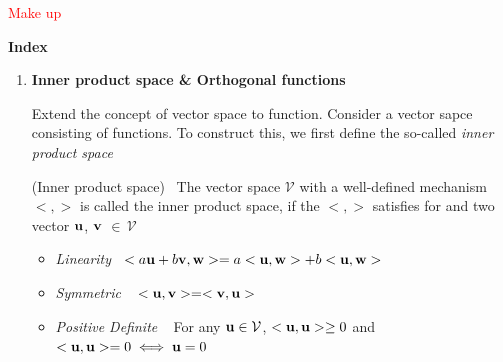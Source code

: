 \documentclass[10pt]{article}
\newenvironment{changemargin}[2]{%
  \begin{list}{}{%
    \setlength{\topsep}{0pt}%
    \setlength{\leftmargin}{#1}%
    \setlength{\rightmargin}{#2}%
    \setlength{\listparindent}{\parindent}%
    \setlength{\itemindent}{\parindent}%
    \setlength{\parsep}{\parskip}%
  }%
  \item[]}{\end{list}}
\begin{document}
\begin{changemargin}{-0.125in}{0in}
\begin{enumerate}
\begin{enumerate}
	               \textcolor{red}{Make up}
	               
	               \medskip
	               
	               
	            
	            
	            
	            
	            
	            
	            
	            
	            \end{enumerate}
	               
	   	   	 	\end{enumerate}
	   	   	 	
	   	   	 	\cleardoublepage
	   	   	 	
	   	   	 	\textbf{Index}
	   	   	 	
	   	   	 	\begin{enumerate}
	   	   	 		\item \textbf{Inner product space \& Orthogonal functions}
	   	   	 		
	   	   	 		\smallskip
	   	   	 		
	   	   	 		Extend the concept of vector space to function. Consider a vector sapce consisting of functions. To construct this, we first define the so-called \textit{inner product space}
	   	   	 		\begin{definition}
	   	   	 			(Inner product space) \, The vector space $\mathcal{V}$ with a well-defined mechanism $<,>$ is called the inner product space, if the $<,>$ satisfies for and two vector $\bold{u}$, $\bold{v}$ $\in \,\mathcal{V}$
	   	   	 			\begin{itemize}
	   	   	 				\item \textit{Linearity}\,\,\,\,\,$<a \bold{u} + b \bold{v}, \bold{w}> = a<\bold{u},\bold{w}> + b<\bold{u},\bold{w}> $
	   	   	 				\item \textit{Symmetric}\,\,\,\,\, $<\bold{u},\bold{v}> = <\bold{v},\bold{u}>$
	   	   	 				\item \textit{Positive Definite}\,\,\,\,\, For any $\bold{u} \in \mathcal{V}$, $<\bold{u},\bold{u}> \geq 0$ and $<\bold{u},\bold{u}> = 0 \iff \bold{u} = 0$
	   	   	 			\end{itemize}
	   	   	 		\end{definition}
	   	   	 	\end{enumerate}



\end{changemargin}
\end{document}
